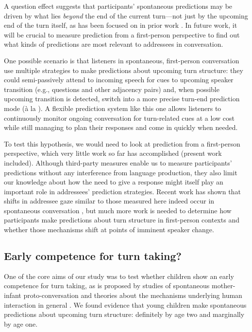 \documentclass[authoryear, 12pt]{elsarticle}
\begin{document}
A question effect suggests that participants' spontaneous predictions may be driven by what lies \textit{beyond} the end of the current turn---not just by the upcoming end of the turn itself, as has been focused on in prior work \citep{bogelstorreira2015, keitel2013, magyari2012, de-ruiter2006}. In future work, it will be crucial to measure prediction from a first-person perspective to find out what kinds of predictions are most relevant to addressees in conversation.

One possible scenario is that listeners in spontaneous, first-person conversation use multiple strategies to make predictions about upcoming turn structure: they could semi-passively attend to incoming speech for cues to upcoming speaker transition (e.g., questions and other adjacency pairs) and, when possible upcoming transition is detected, switch into a more precise turn-end prediction mode (\`{a} la \citealp{de-ruiter2006}). A flexible prediction system like this one allows listeners to continuously monitor ongoing conversation for turn-related cues at a low cost while still managing to plan their responses and come in quickly when needed.

To test this hypothesis, we would need to look at prediction from a first-person perspective, which very little work so far has accomplished (present work included). Although third-party measures enable us to measure participants' predictions without any interference from language production, they also limit our knowledge about how the need to give a response might itself play an important role in addressees' prediction strategies. Recent work has shown that shifts in addressee gaze similar to those measured here indeed occur in spontaneous conversation \citep{holler2015}, but much more work is needed to determine how participants make predictions about turn structure in first-person contexts and whether those mechanisms shift at points of imminent speaker change.

\subsection*{Early competence for turn taking?}

One of the core aims of our study was to test whether children show an early competence for turn taking, as is proposed by studies of spontaneous mother-infant proto-conversation and theories about the mechanisms underlying human interaction in general \citep{hilbrink2015, levinson2006}. We found evidence that young children make spontaneous predictions about upcoming turn structure: definitely by age two and marginally by age one.
\end{document}
